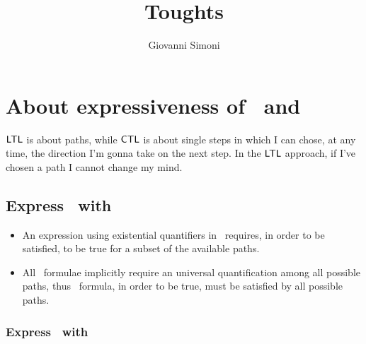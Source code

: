 \documentclass[a3paper]{article}
\title{Toughts}
\author{Giovanni Simoni}
\begin{document}
    \maketitle

    \section{About expressiveness of \CTL\ and \LTL}

        ${\sf LTL}$ is about paths, while ${\sf CTL}$ is about single steps in which
        I can chose, at any time, the direction I'm gonna take on the next
        step. In the ${\sf LTL}$ approach, if I've chosen a path I cannot
        change my mind.

        \subsection{Express \CTL\ with \LTL}

            \begin{itemize}

            \item   An expression using existential quantifiers in
                    \CTL\ requires, in order to be satisfied, to be true
                    for a subset of the available paths.

            \item   All \LTL\ formulae implicitly require an universal
                    quantification among all possible paths, thus \LTL\
                    formula, in order to be true, must be satisfied by all
                    possible paths.

            \end{itemize}

        \subsubsection{Express \LTL\ with \CTL}
\end{document}

